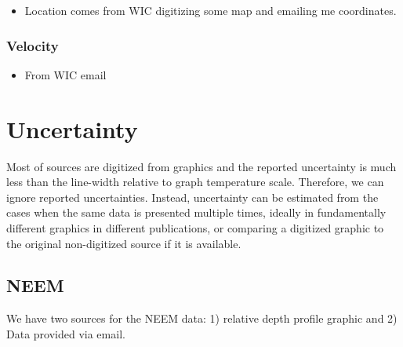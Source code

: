 \documentclass[article,a4paper,times,11pt,twoside]{article}
\begin{document}
\begin{itemize}
\item Location comes from WIC digitizing some map and emailing me coordinates.
\end{itemize}

\subsubsection{Velocity}
\label{sec:org1b74e31}

\begin{itemize}
\item From WIC email
\end{itemize}

\clearpage
\section{Uncertainty}
\label{sec:orgc31ce1b}
Most of sources are digitized from graphics and the reported uncertainty is much less than the line-width relative to graph temperature scale. Therefore, we can ignore reported uncertainties. Instead, uncertainty can be estimated from the cases when the same data is presented multiple times, ideally in fundamentally different graphics in different publications, or comparing a digitized graphic to the original non-digitized source if it is available.

\subsection{NEEM}
\label{sec:org78ac859}

We have two sources for the NEEM data: 1) \textcite{macgregor_2015} relative depth profile graphic and 2) Data provided via email.
\end{document}

